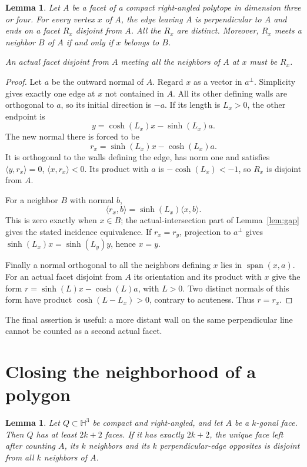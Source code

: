 \documentclass[11pt]{article}
\newtheorem{lemma}[theorem]{Lemma}
\theoremstyle{remark}
\newcommand{\HH}{\mathbb H}
\newcommand{\ip}[2]{\langle #1,#2\rangle}
\begin{document}
\begin{lemma}\label{lem:opposite}
Let $A$ be a facet of a compact right-angled polytope in dimension three
or four. For every vertex $x$ of $A$, the edge leaving $A$ is perpendicular
to $A$ and ends on a facet $R_x$ disjoint from $A$. All the $R_x$ are
distinct. Moreover, $R_x$ meets a neighbor $B$ of $A$ if and only if $x$
belongs to $B$.

An actual facet disjoint from $A$ meeting all the neighbors of $A$ at
$x$ must be $R_x$.
\end{lemma}
\begin{proof}
Let $a$ be the outward normal of $A$. Regard $x$ as a vector in
$a^\perp$. Simplicity gives exactly one edge at $x$ not contained in
$A$. All its other defining walls are orthogonal to $a$, so its initial
direction is $-a$. If its length is $L_x>0$, the other endpoint is
\[
 y=\cosh(L_x)x-\sinh(L_x)a.
\]
The new normal there is forced to be
\begin{equation}\label{eq:opposite-normal}
 r_x=\sinh(L_x)x-\cosh(L_x)a.
\end{equation}
It is orthogonal to the walls defining the edge, has norm one and
satisfies $\ip{y}{r_x}=0$, $\ip{x}{r_x}<0$. Its product with $a$ is
$-\cosh(L_x)<-1$, so $R_x$ is disjoint from $A$.

For a neighbor $B$ with normal $b$,
\[
 \ip{r_x}{b}=\sinh(L_x)\ip{x}{b}.
\]
This is zero exactly when $x\in B$; the actual-intersection part of
Lemma~\ref{lem:gap} gives the stated incidence equivalence. If $r_x=r_y$,
projection to $a^\perp$ gives
$\sinh(L_x)x=\sinh(L_y)y$, hence $x=y$.

Finally a normal orthogonal to all the neighbors defining $x$ lies in
$\operatorname{span}(x,a)$. For an actual facet disjoint from $A$ its
orientation and its product with $x$ give the form
$r=\sinh(L)x-\cosh(L)a$, with $L>0$. Two distinct normals of this form
have product $\cosh(L-L_x)>0$, contrary to acuteness. Thus $r=r_x$.
\end{proof}

The final assertion is useful: a more distant wall on the same
perpendicular line cannot be counted as a second actual facet.

\section{Closing the neighborhood of a polygon}

\begin{lemma}\label{lem:polygon}
Let $Q\subset\HH^3$ be compact and right-angled, and let $A$ be a
$k$-gonal face. Then $Q$ has at least $2k+2$ faces. If it has exactly
$2k+2$, the unique face left after counting $A$, its $k$ neighbors and
its $k$ perpendicular-edge opposites is disjoint from all $k$ neighbors
of $A$.
\end{lemma}
\end{document}
